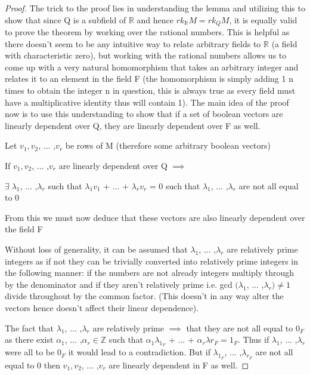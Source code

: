 \documentclass[usletter]{article}
\begin{document}
\begin{proof}
The trick to the proof lies in understanding the lemma and utilizing this to show that since Q is a subfield of $\mathbb{R}$ and hence $rk_{\mathbb{R}} M = rk_Q M $, it is equally valid to prove the theorem by working over the rational numbers. This is helpful as there doesn't seem to be any intuitive way to relate arbitrary fields to $\mathbb{R}$ (a field with characteristic zero), but working with the rational numbers allows us to come up with a very natural homomorphism that takes an arbitrary integer and relates it to an element in the field F (the homomorphism is simply adding 1 n times to obtain the integer n in question, this is always true as every field must have a multiplicative identity thus will contain 1). The main idea of the proof now is to use this understanding to show that if a set of boolean vectors are linearly dependent over Q, they are linearly dependent over F as well. \newline

\noindent Let $v_1, v_2$, ... ,$v_r$ be rows of M (therefore some arbitrary boolean vectors) \newline

\noindent If $v_1, v_2$, ... ,$v_r$ are linearly dependent over Q $\implies$ \newline

\noindent $\exists \; \lambda_1$, ... ,$\lambda_r$ such that $\lambda_1 v_1$ +  ... + $\lambda_rv_r$ = 0 such that $\lambda_1$, ... ,$\lambda_r$ are not all equal to 0\newline

\noindent From this we must now deduce that these vectors are also linearly dependent over the field F \newline

\noindent Without loss of generality, it can be assumed that $\lambda_1$, ... ,$\lambda_r$ are relatively prime integers as if not they can be trivially converted into relatively prime integers in the following manner: if the numbers are not already integers multiply through by the denominator and if they aren't relatively prime i.e. gcd $(\lambda_1$, ... ,$\lambda_r) \neq 1$ divide throughout by the common factor. (This doesn't in any way alter the vectors hence doesn't affect their linear dependence).\newline

\noindent The fact that $\lambda_1$, ... ,$\lambda_r$ are relatively prime $\implies$ that they are not all equal to $0_F$ as there exist $\alpha_1$, ... ,$\alpha_r \in \mathbb{Z}$ such that $\alpha_1 \lambda_{1_F}$ + ... + $\alpha_r \lambda{r_F} = 1_F$. Thus if $\lambda_1$, ... ,$\lambda_r$ were all to be $0_F$ it would lead to a contradiction. But if $\lambda_{1_F}$, ... ,$\lambda_{r_F}$ are not all equal to 0 then $v_1, v_2$, ... ,$v_r$ are linearly dependent in F as well.\newline


\end{proof}
\end{document}

